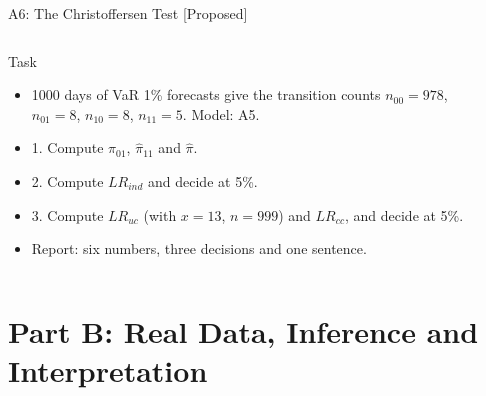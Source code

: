 \begin{frame}{A6: The Christoffersen Test [Proposed]}
\propsub
\itemsize{\scriptsize}
\begin{columns}[T]
\begin{column}{\taskw}
\begin{block}{Task}
\begin{itemize}
    \item 1000 days of VaR 1\% forecasts give the transition counts $n_{00} = 978$, $n_{01} = 8$, $n_{10} = 8$, $n_{11} = 5$. Model: A5.
    \item 1. Compute $\hat\pi_{01}$, $\hat\pi_{11}$ and $\hat\pi$.
    \item 2. Compute $LR_{ind}$ and decide at 5\%.
    \item 3. Compute $LR_{uc}$ (with $x = 13$, $n = 999$) and $LR_{cc}$, and decide at 5\%.
    \item Report: six numbers, three decisions and one sentence.
\end{itemize}
\end{block}
\end{column}
\begin{column}{\solw}
\end{column}
\end{columns}
\end{frame}


\section{Part B: Real Data, Inference and Interpretation}

